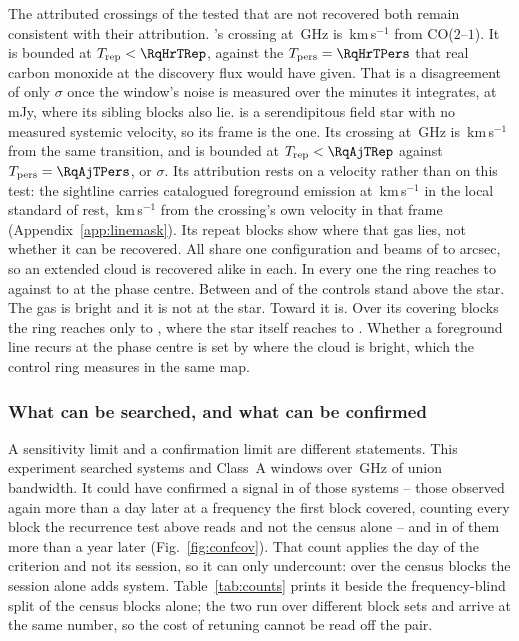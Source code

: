 The \MkAttrExcl{} attributed crossings of the \MkAttrTested{} tested that are
not recovered both remain consistent with their attribution. \RqHrStar's crossing at \RqHrFreq\,GHz is \RqHrDv\,km\,s$^{-1}$ from
CO($2$--$1$). It is bounded at $T_{\rm rep}<\RqHrTRep$, against the
$T_{\rm pers}=\RqHrTPers$ that real carbon monoxide at the discovery flux
would have given. That is a disagreement of only \RqHrExcl$\sigma$ once the
window's noise is measured over the \RqHrOnsMin{} minutes it integrates, at
\RqHrRms\,mJy, where its sibling blocks also lie. \RqAjStar{} is a serendipitous field star with no measured systemic
velocity, so its frame is the \RqAjFrame{} one. Its crossing at
\RqAjFreq\,GHz is \RqAjDv\,km\,s$^{-1}$ from the same transition, and is
bounded at $T_{\rm rep}<\RqAjTRep$ against $T_{\rm pers}=\RqAjTPers$, or
\RqAjExcl$\sigma$. Its attribution rests
on a velocity rather than on this test: the sightline carries catalogued
foreground emission at \LsLupVco\,km\,s$^{-1}$ in the local standard of rest,
\LsLupDv\,km\,s$^{-1}$ from the crossing's own velocity in that frame
(Appendix~\ref{app:linemask}). Its repeat blocks show where that gas lies, not
whether it can be recovered. All \RqAjNRep{} share one \RqAjArray{} configuration and beams of
\RqAjBeamLo{} to \RqAjBeamHi{} arcsec, so an extended cloud is recovered
alike in each. In every one the ring reaches \RqAjCtrlLo{} to \RqAjCtrlHi{} against
\RqAjStarLo{} to \RqAjStarHi{} at the phase centre. Between \RqAjNgeLo{} and
\RqAjNgeHi{} of the \NCtrl{} controls stand above the star.
The gas is bright and it is not at the star. Toward \RqRecurCloudStars{} it is. Over its \RqCtlNBlock{} covering blocks
the ring reaches only \RqCtlRingLo{} to \RqCtlRingHi, where the star itself
reaches \RqCtlStarLo{} to \RqCtlStarHi.
Whether a foreground line recurs at the phase centre is set by where the cloud
is bright, which the control ring measures in the same map.

\subsubsection{What can be searched, and what can be confirmed}
\label{sec:confirmability}

A sensitivity limit and a confirmation limit are different statements. This experiment searched \RcSearchSys{} systems and \RcSearchWin{}
Class~A windows over \CvUnionA\,GHz of union bandwidth. It could have
confirmed a signal in \ZcConfSysDay{} of those systems -- those observed
again more than a day later at a frequency the first block covered, counting
every block the recurrence test above reads and not the census alone -- and
in \ZcConfSysYr{} of them more than a year later
(Fig.~\ref{fig:confcov}). That count applies the day of the criterion and
not its session, so it can only undercount: over the census blocks the
session alone adds \QcConfAddCenWord{} system. Table~\ref{tab:counts} prints
it beside the frequency-blind split of
the census blocks alone; the two run over different block sets and arrive at
the same number, so the cost of retuning cannot be read off the pair.

